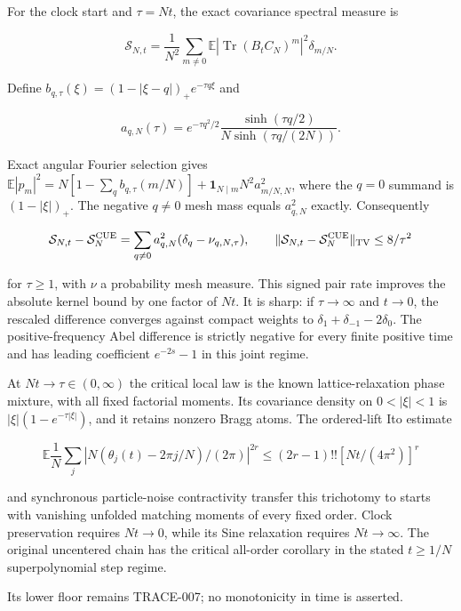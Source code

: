 \begin{theorem}\label{pass2:frontier-flow-018}

For the clock start and \(\tau=Nt\), the exact covariance spectral measure is

\[
\mathcal S_{N,t}=\frac1{N^2}\sum_{m\ne0}
\mathbb E|\operatorname{Tr}(B_tC_N)^m|^2\delta_{m/N}.
\]

Define \(b_{q,\tau}(\xi)=(1-|\xi-q|)_+e^{-\tau q\xi}\) and

\[
a_{q,N}(\tau)=e^{-\tau q^2/2}
\frac{\sinh(\tau q/2)}{N\sinh(\tau q/(2N))}.
\]

Exact angular Fourier selection gives
\(\mathbb E|p_m|^2=N[1-\sum_q b_{q,\tau}(m/N)] +\mathbf1_{N\mid m}N^2a_{m/N,N}^2\), where the \(q=0\) summand is
\((1-|\xi|)_+\). The negative \(q\ne0\) mesh mass equals \(a_{q,N}^2\)
exactly. Consequently

\[
\mathcal S_{N,t}-\mathcal S_N^{\rm CUE}
=\sum_{q\ne0}a_{q,N}^2(\delta_q-\nu_{q,N,\tau}),\qquad
\|\mathcal S_{N,t}-\mathcal S_N^{\rm CUE}\|_{\rm TV}\le8/\tau^2
\]

for \(\tau\ge1\), with \(\nu\) a probability mesh measure. This signed pair
rate improves the absolute kernel bound by one factor of \(Nt\). It is
sharp: if \(\tau\to\infty\) and \(t\to0\), the rescaled difference converges
against compact weights to \(\delta_1+\delta_{-1}-2\delta_0\).
The positive-frequency Abel difference is strictly negative for every
finite positive time and has leading coefficient \(e^{-2s}-1\) in this
joint regime.

At \(Nt\to\tau\in(0,\infty)\) the critical local law is the known
lattice-relaxation phase mixture, with all fixed factorial moments.
Its covariance density on \(0<|\xi|<1\) is
\(|\xi|(1-e^{-\tau|\xi|})\), and it retains nonzero Bragg atoms.
The ordered-lift Ito estimate

\[
\mathbb E\frac1N\sum_j|N(\theta_j(t)-2\pi j/N)/(2\pi)|^{2r}
\le(2r-1)!![Nt/(4\pi^2)]^r
\]

and synchronous particle-noise contractivity transfer this trichotomy to
starts with vanishing unfolded matching moments of every fixed order.
Clock preservation requires \(Nt\to0\), while its Sine relaxation requires
\(Nt\to\infty\). The original uncentered chain has the critical all-order
corollary in the stated \(t\ge1/N\) superpolynomial step regime.

\end{theorem}

Its lower floor remains TRACE-007; no monotonicity in time
is asserted.

